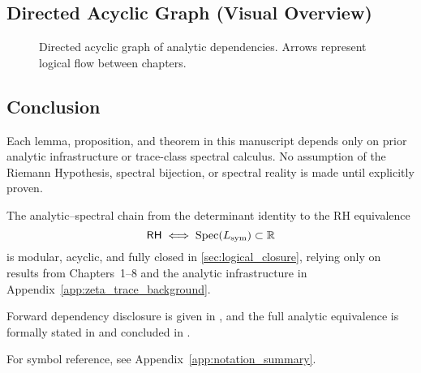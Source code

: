 \subsection*{Directed Acyclic Graph (Visual Overview)}
\begin{figure}[ht]
\centering
{}
\caption{Directed acyclic graph of analytic dependencies. Arrows represent logical flow between chapters.}
\label{fig:dag_visual}
\end{figure}

\subsection*{Conclusion}

Each lemma, proposition, and theorem in this manuscript depends only on prior analytic infrastructure or trace-class spectral calculus. No assumption of the Riemann Hypothesis, spectral bijection, or spectral reality is made until explicitly proven.

The analytic–spectral chain from the determinant identity to the RH equivalence
\[
\mathsf{RH} \iff \operatorname{Spec}(L_{\mathrm{sym}}) \subset \mathbb{R}
\]
is modular, acyclic, and fully closed in \cref{sec:logical_closure}, relying only on results from Chapters~1–8 and the analytic infrastructure in Appendix~\ref{app:zeta_trace_background}.

Forward dependency disclosure is given in , and the full analytic equivalence is formally stated in  and concluded in .

For symbol reference, see Appendix~\ref{app:notation_summary}.

